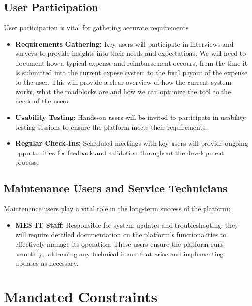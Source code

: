 \documentclass[12pt]{article}
\begin{document}
\subsection{User Participation}
User participation is vital for gathering accurate requirements:
\begin{itemize}
    \item \textbf{Requirements Gathering:} Key users will participate in interviews and surveys to provide insights into their needs and expectations. We will need to document how a typical expense and reimbursement occours, from the time it is submitted into the current expese system to the final payout of the expense to the user. This will provide a clear overview of how the current system works, what the roadblocks are and how we can optimize the tool to the needs of the users.
    \item \textbf{Usability Testing:} Hands-on users will be invited to participate in usability testing sessions to ensure the platform meets their requirements.
    \item \textbf{Regular Check-Ins:} Scheduled meetings with key users will provide ongoing opportunities for feedback and validation throughout the development process.
\end{itemize}

\subsection{Maintenance Users and Service Technicians}
Maintenance users play a vital role in the long-term success of the platform:
\begin{itemize}
    \item \textbf{MES IT Staff:} Responsible for system updates and troubleshooting, they will require detailed documentation on the platform's functionalities to effectively manage its operation. These users ensure the platform runs smoothly, addressing any technical issues that arise and implementing updates as necessary.
\end{itemize}




\section{Mandated Constraints}
\end{document}
